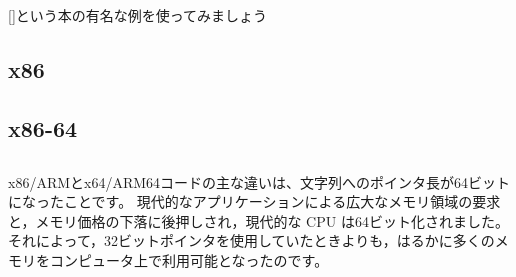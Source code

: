 \mysection{\HelloWorldSectionName}
\label{sec:helloworld}

[\KRBook]という本の有名な例を使ってみましょう



\subsection{x86}





\subsection{x86-64}








\subsection{\Conclusion{}}

x86/ARMとx64/ARM64コードの主な違いは、文字列へのポインタ長が64ビットになったことです。
現代的なアプリケーションによる広大なメモリ領域の要求と，メモリ価格の下落に後押しされ，現代的な \ac{CPU} は64ビット化されました。
それによって，32ビットポインタを使用していたときよりも，はるかに多くのメモリをコンピュータ上で利用可能となったのです。


